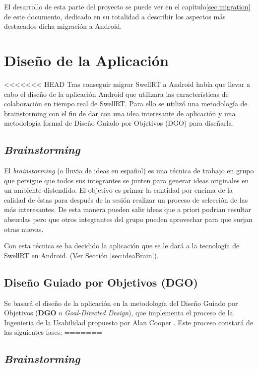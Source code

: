 El desarrollo de esta parte del proyecto se puede ver en el capítulo\ref{sec:migration} de este documento, dedicado en su totalidad a describir los aspectos más destacados dicha migración a Android. 

\section{Diseño de la Aplicación}

<<<<<<< HEAD
	Tras conseguir migrar SwellRT a Android había que llevar a cabo el diseño de la aplicación Android que utilizara las características de colaboración en tiempo real de SwellRT. Para ello se utilizó una metodología de brainstorming con el fin de dar con una idea interesante de aplicación y una metodología formal de Diseño Guiado por Objetivos (DGO) para diseñarla.

  \subsection{\textit{Brainstorming}}
  
  El \textit{brainstorming} \cite{ref:bookBrainStorming} (o lluvia de ideas en español) es una técnica de trabajo en grupo que persigue que todos sus integrantes se junten para generar ideas originales en un ambiente distendido. El objetivo es primar la cantidad por encima de la calidad de éstas para después de la sesión realizar un proceso de selección de las más interesantes. De esta manera pueden salir ideas que a priori podrian resultar absurdas pero que otros integrantes del grupo pueden aprovechar para que surjan otras nuevas. 
  
  Con esta técnica se ha decidido la aplicación que se le dará a la tecnología de SwellRT en Android. (Ver Sección \ref{sec:ideaBrain}).
  
  \subsection{Diseño Guiado por Objetivos (DGO)}\label{ssec:dgoDesign}
  
  Se basará el diseño de la aplicación en la metodología del Diseño Guiado por Objetivos (\textbf{DGO} o \textit{Goal-Directed Design}), que implementa el proceso de la Ingeniería de la Usabilidad propuesto por Alan Cooper \cite{ref:bookAlanCooper}. Este proceso constará de las siguientes fases:
=======
  \subsection{\textit{Brainstorming}}
  
